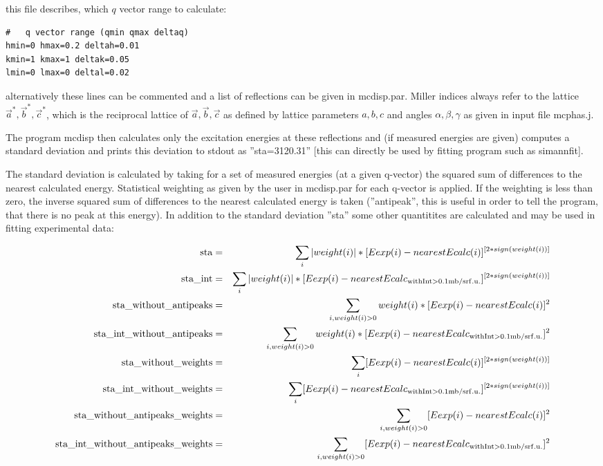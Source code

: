 this file describes, which $q$ vector range to
calculate:

\begin{verbatim}
#   q vector range (qmin qmax deltaq)
hmin=0 hmax=0.2 deltah=0.01
kmin=1 kmax=1 deltak=0.05
lmin=0 lmax=0 deltal=0.02
\end{verbatim}

alternatively these lines can be commented and a
list of reflections can be given in {\prg mcdisp.par}.
Miller indices always refer to the lattice $\vec a^*, \vec b^*, \vec c^*$, which
is the reciprocal lattice of $\vec a, \vec b, \vec c$ as defined by lattice
parameters $a,b,c$ and angles $\alpha,\beta,\gamma$ as given in
input file {\prg mcphas.j}.


The
program {\prg mcdisp} then calculates only 
the excitation energies at these reflections and (if measured
energies are given) computes a standard deviation
and prints
this deviation to stdout as ''sta=3120.31'' [this can directly
be used by fitting program such as {\prg simannfit}].

The standard deviation is calculated by taking for a set of measured energies (at a 
given q-vector) the squared sum of differences to the nearest
calculated energy. Statistical weighting as given by the user in {\prg mcdisp.par}
for each q-vector is applied. If the weighting is less than zero, the 
inverse squared sum of differences to the nearest
calculated energy is taken (''antipeak'', this is useful in order to 
tell the program, that there is no peak at this energy).
In addition to the standard deviation ''sta'' some other quantitites are calculated and 
may be used in fitting experimental data:

\begin{eqnarray}
{\rm sta}                              & =& \sum_i |weight(i)|*[Eexp(i) - nearestEcalc(i)]^{[2*sign(weight(i))]}\\
{\rm sta\_int   }                       & = &\sum_i |weight(i)|*[Eexp(i) - nearestEcalc_{\rm with %
Int>0.1mb/srf.u.}]^{[2*sign(weight(i))]}\\
{\rm sta\_without\_antipeaks }           & =& \sum_{i, weight(i)>0}  weight(i)*[Eexp(i) - nearestEcalc(i)]^2\\
{\rm sta\_int\_without\_antipeaks }       & =&\sum_{i,weight(i)>0}  weight(i)*[Eexp(i) - nearestEcalc_{\rm with %
Int>0.1mb/srf.u.}]^2\\
{\rm sta\_without\_weights }              &=& \sum_i [Eexp(i) - nearestEcalc(i)]^{[2*sign(weight(i))]}\\
{\rm sta\_int\_without\_weights}          & =&\sum_i [Eexp(i) - nearestEcalc_{\rm with %
Int>0.1mb/srf.u.}]^{[2*sign(weight(i))]}\\
{\rm sta\_without\_antipeaks\_weights}    & = &\sum_{i, weight(i)>0}[Eexp(i) - nearestEcalc(i)]^2\\
{\rm sta\_int\_without\_antipeaks\_weights}& =& \sum_{i, weight(i)>0} [Eexp(i) - nearestEcalc_{\rm with %
Int>0.1mb/srf.u.}]^2\\
\end{eqnarray}




